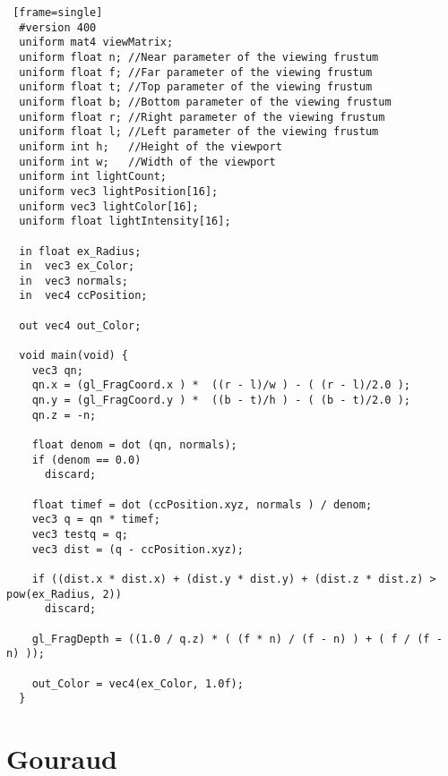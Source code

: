 \begin{lstlisting} [frame=single]
  #version 400
  uniform mat4 viewMatrix;
  uniform float n; //Near parameter of the viewing frustum
  uniform float f; //Far parameter of the viewing frustum
  uniform float t; //Top parameter of the viewing frustum
  uniform float b; //Bottom parameter of the viewing frustum
  uniform float r; //Right parameter of the viewing frustum
  uniform float l; //Left parameter of the viewing frustum
  uniform int h;   //Height of the viewport
  uniform int w;   //Width of the viewport
  uniform int lightCount;
  uniform vec3 lightPosition[16];
  uniform vec3 lightColor[16];
  uniform float lightIntensity[16];

  in float ex_Radius;
  in  vec3 ex_Color;
  in  vec3 normals;
  in  vec4 ccPosition;

  out vec4 out_Color;

  void main(void) {
    vec3 qn;
    qn.x = (gl_FragCoord.x ) *  ((r - l)/w ) - ( (r - l)/2.0 );
    qn.y = (gl_FragCoord.y ) *  ((b - t)/h ) - ( (b - t)/2.0 );
    qn.z = -n;

    float denom = dot (qn, normals);
    if (denom == 0.0)
      discard;

    float timef = dot (ccPosition.xyz, normals ) / denom;
    vec3 q = qn * timef;
    vec3 testq = q;
    vec3 dist = (q - ccPosition.xyz);

    if ((dist.x * dist.x) + (dist.y * dist.y) + (dist.z * dist.z) > pow(ex_Radius, 2))
      discard;

    gl_FragDepth = ((1.0 / q.z) * ( (f * n) / (f - n) ) + ( f / (f - n) ));

    out_Color = vec4(ex_Color, 1.0f);
  }
\end{lstlisting}


\section{Gouraud \label{gouraud}}
